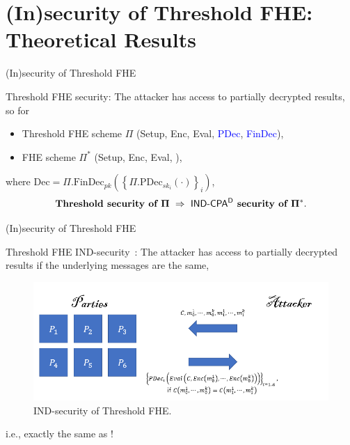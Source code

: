\documentclass[handout]{beamer}
\begin{document}
\section{(In)security of Threshold FHE:\\ {\normalsize Theoretical Results}}

	\begin{frame}{(In)security of Threshold FHE}

        Threshold FHE security: The attacker has access to partially decrypted results, so for\vspace{0.3cm}
		\begin{itemize}
			\item Threshold FHE scheme $\Pi$ (Setup, Enc, Eval, \textcolor{blue}{PDec}, \textcolor{blue}{FinDec}),
			\item FHE scheme $\Pi^*$ (Setup, Enc, Eval, ), 
		\end{itemize}
        where $\text{Dec}= \Pi.\text{FinDec}_{pk} \left(\left\{\Pi.\text{PDec}_{sk_i}(\cdot)\right\}_i\right)$, \vspace{0.3cm}
		\[\bf
            \textbf{Threshold security of } \Pi ~\Rightarrow~ \text{\sf IND-CPA$\sf ^D$} \textbf{ security of } \Pi^*.
        \]
	\end{frame}

	\begin{frame}{(In)security of Threshold FHE}

        Threshold FHE IND-security~\cite{cryptoeprint:2017/257}: The attacker has access to partially decrypted results if the underlying messages are the same,\vspace{0.4cm}
        
        \begin{figure}[h]
            \centering
            \includegraphics[width=\linewidth]{ThreshFHE.png}
            \caption{IND-security of Threshold FHE. }
        \end{figure}

        i.e., exactly the same as \indcpad!
	\end{frame}
\end{document}
